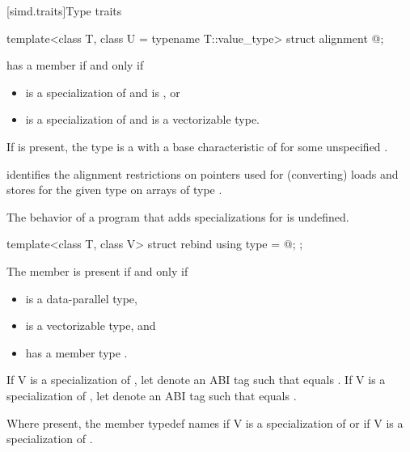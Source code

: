 [simd.traits]{Type traits}

\begin{itemdecl}
template<class T, class U = typename T::value_type> struct alignment { @\seebelow@ };
\end{itemdecl}

\begin{itemdescr}
\pnum
{} has a member  if and only if
\begin{itemize}
 \item
    is a specialization of  and  is
   , or
 \item
    is a specialization of  and  is a
   vectorizable type.
\end{itemize}

\pnum
If  is present, the type  is a
 with a base characteristic of
 for some unspecified
.
\begin{note}
 identifies the alignment restrictions on pointers used for
(converting) loads and stores for the given type  on arrays of type
.
\end{note}

\pnum
The behavior of a program that adds specializations for 
is undefined.
\end{itemdescr}

\begin{itemdecl}
template<class T, class V> struct rebind { using type = @\seebelow@; };
\end{itemdecl}

\begin{itemdescr}
\pnum
The member  is present if and only if
\begin{itemize}
\item {} is a data-parallel type,
\item {} is a vectorizable type, and
\item {} has a member type
  .
\end{itemize}

\pnum
If \tcode V is a specialization of , let  denote
an ABI tag such that  equals
.
If \tcode V is a specialization of , let 
denote an ABI tag such that  equals .

\pnum
Where present, the member typedef  names 
if \tcode V is a specialization of  or
 if \tcode V is a specialization of
.
\end{itemdescr}

